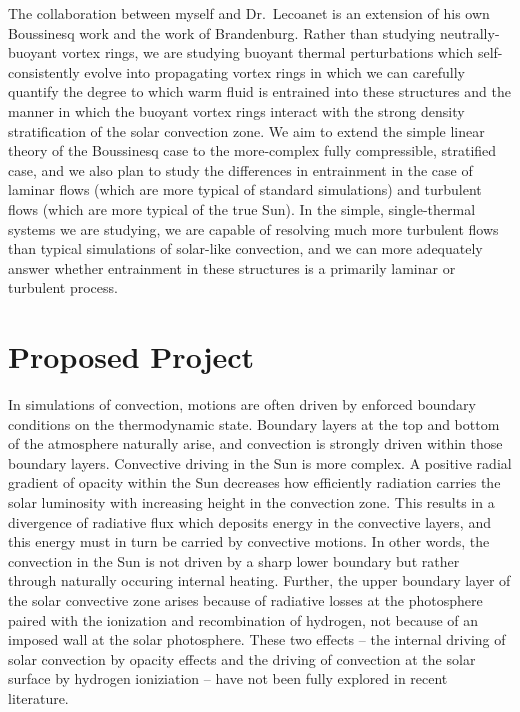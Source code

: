 \documentclass[aasms,12pt]{article}
\begin{document}
The collaboration between myself and Dr.~Lecoanet is an extension of his own Boussinesq work
and the work of Brandenburg. Rather than studying neutrally-buoyant vortex rings, we are studying
buoyant thermal perturbations which self-consistently evolve into propagating vortex rings
in which we can carefully quantify the degree to which warm fluid is entrained into these
structures and the manner in which the buoyant vortex rings interact with the strong
density stratification of the solar convection zone. We aim to extend the simple linear theory
of the Boussinesq case to the more-complex fully compressible, stratified case, and we also
plan to study the differences in entrainment in the case of laminar flows (which are more
typical of standard simulations) and turbulent flows (which are more typical of the true
Sun). In the simple, single-thermal systems we are studying, we are capable of resolving
much more turbulent flows than typical simulations of solar-like convection, and we can more
adequately answer whether entrainment in these structures is a primarily laminar or turbulent
process.


\section{Proposed Project}
In simulations of convection, motions are often driven by enforced boundary conditions
on the thermodynamic state.  Boundary layers at the top and bottom of the atmosphere naturally arise,
and convection is strongly driven within those boundary layers.  Convective driving in the Sun is more
complex. A positive radial gradient of opacity within the Sun decreases how efficiently radiation carries
the solar luminosity with increasing height in the convection zone.
This results in a divergence of radiative flux which deposits
energy in the convective layers, and this energy must in turn be carried by convective motions.
In other words, the convection in the Sun is not driven by a sharp lower boundary but rather
through naturally occuring internal heating.
Further, the upper boundary layer of the solar convective zone arises because of 
radiative losses at the photosphere paired with the ionization and 
recombination of hydrogen, not because of an imposed wall at the solar photosphere. These
two effects -- the internal driving of solar convection by opacity effects 
and the driving of convection at the solar surface 
by hydrogen ioniziation -- have not been fully explored in recent literature.
\end{document}
